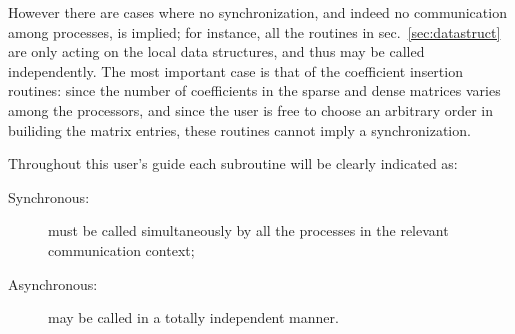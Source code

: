 However there are cases where no synchronization, and indeed no
communication among processes, is implied; for instance, all the routines in
sec.~\ref{sec:datastruct} are only acting on the local data structures,
and thus may be called independently. The most important case is that
of the coefficient insertion routines: since the number of
coefficients in the sparse and dense matrices varies among the
processors, and since the user is free to choose an arbitrary order in
builiding the matrix entries, these routines cannot imply a
synchronization. 

Throughout this user's guide each subroutine will be clearly indicated
as:
\begin{description}
\item[Synchronous:] must be called simultaneously by all the
  processes in the relevant communication context;
\item[Asynchronous:] may be called in a totally independent manner.
\end{description}

